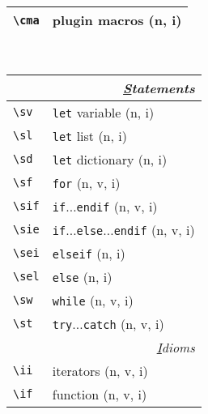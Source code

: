 \documentclass[oneside,10pt,landscape,DIV16]{scrartcl}
\begin{document}
\begin{multicols}{3}
\begin{center}
\begin{tabular}[]{|p{18mm}|p{56mm}|}
\hline     \verb'\cma'  & plugin macros                     \hfill (n, i)\\
\hline
\end{tabular}\\
%
%
\begin{tabular}[]{|p{11mm}|p{56mm}|}
\hline
\multicolumn{2}{|r|}{\textsl{\underline{S}tatements}}\\[1.0ex]
\hline \verb'\sv'     & \verb'let' variable                              \hfill (n, i)\\
\hline \verb'\sl'     & \verb'let' list                                  \hfill (n, i)\\
\hline \verb'\sd'     & \verb'let' dictionary                            \hfill (n, i)\\
\hline \verb'\sf'     & \verb'for'                                       \hfill (n, v, i)\\
\hline \verb'\sif'    & \verb'if'$\ldots$\verb'endif'                    \hfill (n, v, i)\\
\hline \verb'\sie'    & \verb'if'$\ldots$\verb'else'$\ldots$\verb'endif' \hfill (n, v, i)\\
\hline \verb'\sei'    & \verb'elseif'                                    \hfill (n, i)\\
\hline \verb'\sel'    & \verb'else'                                      \hfill (n, i)\\
\hline \verb'\sw'     & \verb'while'                                     \hfill (n, v, i)\\
\hline \verb'\st'     & \verb'try'$\ldots$\verb'catch'                   \hfill (n, v, i)\\
\hline
\hline
\multicolumn{2}{|r|}{\textsl{\underline{I}dioms}}                 \\[1.0ex]
\hline \verb'\ii'  & iterators      \hfill (n, v, i)   \\
%
\hline \verb'\if' & function                  \hfill (n, v, i)\\

\end{tabular}
\end{center}
\end{multicols}
\end{document}
